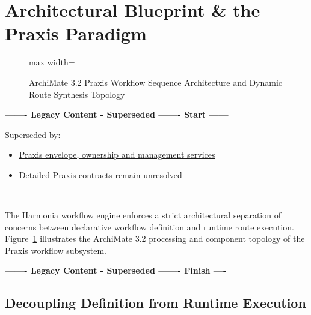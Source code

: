 \section{Architectural Blueprint \& the Praxis Paradigm}
\label{sec:praxis_paradigm}

\begin{figure}[htbp]
    \centering
    \begin{adjustbox}{max width=\textwidth}
        
    \end{adjustbox}
    \caption{ArchiMate 3.2 Praxis Workflow Sequence Architecture and Dynamic Route Synthesis Topology}
    \label{fig:praxis_workflow_architecture}
\end{figure}

\par\noindent\textbf{------- Legacy Content - Superseded ------- Start ------}
\par\noindent Superseded by:
\begin{itemize}
  \item \href{../../markdown/05-information-systems-architecture/pathways-journeys-and-handoff.md\#praxis-operational-context}{Praxis envelope, ownership and management services}
  \item \href{../../markdown/05-information-systems-architecture/gaps.md}{Detailed Praxis contracts remain unresolved}
\end{itemize}
\noindent ---------------------------------------------------------

The Harmonia workflow engine enforces a strict architectural separation of concerns between declarative workflow definition and runtime route execution. Figure~\ref{fig:praxis_workflow_architecture} illustrates the ArchiMate 3.2 processing and component topology of the Praxis workflow subsystem.

\par\noindent\textbf{------- Legacy Content - Superseded ------- Finish ----}


\subsection{Decoupling Definition from Runtime Execution}
\label{subsec:praxis_decoupling}

